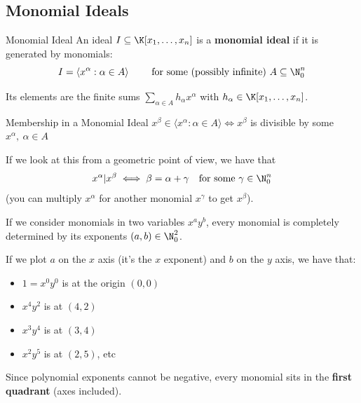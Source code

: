 \documentclass[a4paper, 11pt]{report}
\begin{document}
\subsection{Monomial Ideals}
\begin{defframe}{Monomial Ideal}{}
    An ideal $I \subseteq \K[x_1, \dots, x_{n}]$ is a \textbf{monomial ideal} if it is generated by monomials:
    $$ I = \langle x^{\alpha} : \alpha \in A \rangle \quad \quad \text{ for some (possibly infinite) } A \subseteq \N^{n}_{0}$$

    Its elements are the finite sums $\sum_{\alpha \in A} h_{\alpha}x^{\alpha}$ with $h_{\alpha} \in \K[x_1, \dots, x_{n}]$.
\end{defframe}

\begin{thmframe}{Membership in a Monomial Ideal}{}
    $x^{\beta} \in \langle x^{\alpha} : \alpha \in A\rangle \iff x^{\beta}$ is divisible by some $x^{\alpha}, \ \alpha \in A$
\end{thmframe}

If we look at this from a geometric point of view, we have that
$$ x^{\alpha} | x^{\beta} \iff \beta = \alpha + \gamma \quad \text{for some } \gamma \in \N^{n}_{0} $$
(you can multiply $x^{\alpha}$ for another monomial $x^{\gamma}$ to get $x^{\beta}$).

If we consider monomials in two variables $x^{a}y^{b}$, every monomial is completely determined by its exponents $(a,b)\in \N^{2}_{0}$.

If we plot $a$ on the $x$ axis (it's the $x$ exponent) and $b$ on the $y$ axis, we have that:
\begin{itemize}
    \item $1 = x^{0} y^{0}$ is at the origin $(0,0)$
    \item $x^{4} y^{2}$ is at $(4,2)$
    \item $x^{3} y^{4}$ is at $(3,4)$
    \item $x^{2} y^{5}$ is at $(2,5)$, etc
\end{itemize}

Since polynomial exponents cannot be negative, every monomial sits in the \textbf{first quadrant} (axes included).
\end{document}
